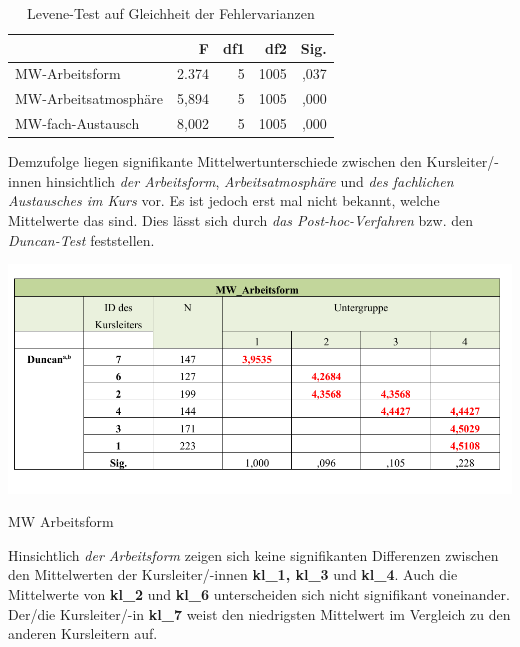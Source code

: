 \documentclass[12pt,a4paper]{article}
\begin{document}


\begin{table}
\begin{center}
\begin{tabular}{|l|r|r|r|r|}
\hline 
 & F & df1 & df2 & Sig. \\ 
\hline 
MW-Arbeitsform & 2.374 & 5 & 1005 & ,037 \\ 
\hline 
MW-Arbeitsatmosphäre & 5,894 & 5 & 1005 & ,000 \\ 
\hline 
MW-fach-Austausch & 8,002 & 5 & 1005 & ,000 \\ 
\hline 
\end{tabular} 
\end{center}
\caption{Levene-Test auf Gleichheit der Fehlervarianzen}
\end{table}
\FloatBarrier

Demzufolge liegen signifikante Mittelwertunterschiede zwischen den Kurs\-lei\-ter/-in\-nen hinsichtlich \textit{der Arbeitsform}, \textit{Arbeitsatmosphäre} und \textit{des fachlichen Austausches im Kurs} vor. Es ist jedoch erst mal nicht bekannt, welche Mittelwerte das sind. Dies lässt sich durch  \textit{das Post-hoc-Verfahren} bzw. den \textit{Duncan-Test} feststellen.


\begin{table}[!ht]
\includegraphics[scale=0.85]{tab01.pdf}
\caption{MW Arbeitsform}
\label{tab.6}
\end{table}
\FloatBarrier

Hinsichtlich \textit{der Arbeitsform} zeigen sich keine signifikanten Differenzen zwischen den Mittelwerten der Kursleiter/-innen \textbf{kl\_1, kl\_3} und \textbf{kl\_4}. Auch die Mittelwerte von \textbf{kl\_2} und \textbf{kl\_6} unterscheiden sich nicht signifikant von\-ei\-nan\-der. Der/die Kursleiter/-in \textbf{kl\_7} weist den niedrigsten Mittelwert im Vergleich zu den anderen Kursleitern auf. 
\end{document}
